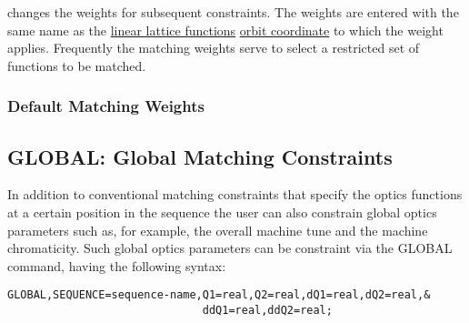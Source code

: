 changes the weights for subsequent constraints.
The weights are entered with the same name as the
\href{../Introduction/tables.html#linear}{linear lattice functions}
\href{../Introduction/closed_orbit.html}{orbit coordinate} 
to which the weight applies.
Frequently the matching weights serve to select a restricted
set of functions to be matched.

\subsubsection{Default Matching Weights}


\subsection{GLOBAL: Global Matching Constraints}
\label{subsec:match_con_global}

In addition to conventional matching constraints that specify the optics 
functions at a certain position in the sequence the user can also constrain 
global optics parameters such as, for example, the overall machine tune
and the machine chromaticity. Such global optics parameters can be
constraint via the  GLOBAL command, having the following syntax:

\begin{verbatim}
GLOBAL,SEQUENCE=sequence-name,Q1=real,Q2=real,dQ1=real,dQ2=real,&
                              ddQ1=real,ddQ2=real;
\end{verbatim}

